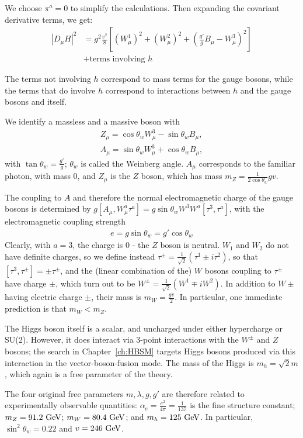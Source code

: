 We choose $\pi^a=0$ to simplify the calculations.
Then expanding the covariant derivative terms, we get:
\begin{align}
  |D_\mu H|^2 &= g^2\frac{v^2}{8}\left[ (W_\mu^1)^2+(W_\mu^2)^2+\left(\frac{g'}{g}B_\mu-W_\mu^3\right)^2\right]\nonumber\\
  &+\text{terms involving $h$}
\end{align}

The terms not involving $h$ correspond to mass terms for the gauge bosons, while the terms that do involve $h$ correspond to interactions between $h$ and the gauge bosons and itself.

We identify a massless and a massive boson with
\begin{align}
Z_\mu = \cos\theta_w W_\mu^3 - \sin\theta_w B_\mu,\\
A_\mu = \sin\theta_w W_\mu^3 + \cos\theta_w B_\mu,
\end{align}
with $\tan \theta_w = \frac{g'}{g}$; $\theta_w$ is called the Weinberg angle.
$A_\mu$ corresponds to the familiar photon, with mass $0$, and $Z_\mu$ is the $Z$ boson, which has mass $m_Z = \frac{1}{2\cos\theta_w}gv$.

The coupling to $A$ and therefore the normal electromagnetic charge of the gauge bosons is determined by $g[A_\mu,W_\mu^a\tau^a] = g\sin\theta_w W^3W^a[\tau^3,\tau^a]$, with the electromagnetic coupling strength
\begin{align}
e = g\sin\theta_w = g'\cos\theta_w
\end{align}
Clearly, with $a=3$, the charge is $0$ - the $Z$ boson is neutral.
$W_1$ and $W_2$ do not have definite charges, so we define instead $\tau^\pm = \frac{1}{\sqrt{2}}\left(\tau^1\pm i\tau^2\right)$, so that $[\tau^3,\tau^\pm] = \pm \tau^\pm$, and the (linear combination of the) $W$ bosons coupling to $\tau^\pm$ have charge $\pm$, which turn out to be $W^\pm = \frac{1}{\sqrt{2}}\left(W^1 \mp iW^2\right)$.
In addition to $W\pm$ having electric charge $\pm$, their mass is $m_W = \frac{gv}{2}$.
In particular, one immediate prediction is that $m_W<m_Z$.

The Higgs boson itself is a scalar, and uncharged under either hypercharge or SU(2).
However, it does interact via $3$-point interactions with the $W^\pm$ and $Z$ bosons; the search in Chapter~\ref{ch:HBSM} targets Higgs bosons produced via this interaction in the vector-boson-fusion mode.
The mass of the Higgs is $m_h = \sqrt{2}m$, which again is a free parameter of the theory.

The four original free parameters $m,\lambda,g,g'$ are therefore related to experimentally observable quantities: $\alpha_e = \frac{e^2}{4\pi} = \frac{1}{137}$ is the fine structure constant; $m_Z = 91.2~\mathrm{GeV}$; $m_W = 80.4~\mathrm{GeV}$; and $m_h = 125~\mathrm{GeV}$.
In particular, $\sin^2\theta_w=0.22$ and $v=246~\mathrm{GeV}$.

